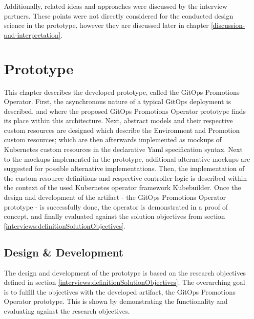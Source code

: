 Additionally,
related ideas and approaches were discussed by the interview partners.
These points were not directly considered for the conducted design science in the prototype,
however they are discussed later in chapter \ref{discussion-and-interpretation}.
















\chapter{Prototype}
\label{chapter:prototype}

This chapter describes the developed prototype,
called the GitOps Promotions Operator.
First, the asynchronous nature of a typical GitOps deployment is described,
and where the proposed GitOps Promotions Operator prototype finds its place within
this architecture.
Next, abstract models and their respective custom resources are designed which describe the Environment and Promotion 
custom resources; which are then afterwards implemented as mockups of 
Kubernetes custom resources in the declarative Yaml specification syntax.
Next to the mockups implemented in the prototype,
additional alternative mockups are suggested for possible alternative implementations.
Then, the implementation of the custom resource definitions and respective controller logic
is described within the context of the used Kubernetes operator framework Kubebuilder.
Once the design and development of the artifact - the GitOps Promotions Operator prototype -
is successfully done,
the operator is demonstrated in a proof of concept,
and finally evaluated against the solution objectives
from section \ref{interviews:definitionSolutionObjectives}.

\section{Design \& Development}

The design and development of the prototype
is based on the research objectives defined in section
\ref{interviews:definitionSolutionObjectives}.
The overarching goal is to fulfill the objectives with the developed artifact,
the GitOps Promotions Operator prototype.
This is shown by demonstrating the functionality and evaluating against the research objectives.

